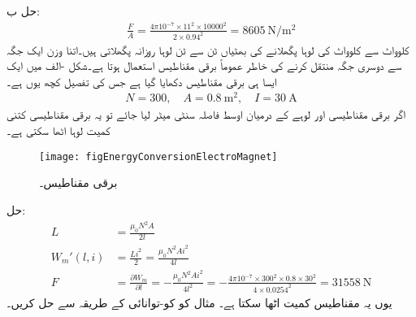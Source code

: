 حل ب:
\begin{align*}
\frac{F}{A}=\frac{4\pi 10^{-7} \times 11^2 \times 10000^2 }{2 \times 0.94^2}=\SI{8605}{\newton \per \meter \squared}
\end{align*}
%
  کلوواٹ سے   کلوواٹ کی لوہا پگھلانے کی بھٹیاں  ٹن سے  ٹن لوہا روزانہ پگھلاتی ہیں۔اتنا وزن ایک جگہ سے دوسری جگہ منتقل کرنے کی خاطر عموماً برقی مقناطیس استعمال ہوتا ہے۔شکل -الف میں ایک ایسا ہی برقی مقناطیس دکھایا گیا ہے جس کی تفصیل کچھ یوں ہے۔
\begin{align*}
N=300, \quad A=\SI{0.8}{\meter \squared}, \quad I=\SI{30}{\ampere}
\end{align*}
اگر برقی مقناطیسی اور لوہے کے درمیان اوسط فاصلہ  سنٹی میٹر لیا جائے تو یہ برقی مقناطیسی کتنی کمیت لوہا اٹھا سکتی ہے۔
\begin{figure}
\centering
\texttt{[image: figEnergyConversionElectroMagnet]}
\caption{برقی مقناطیس۔}
\label{شکل_تبادلہ_توانائی_برقی_مقناطیس}
\end{figure}

حل:
\begin{align*}
L&=\frac{\mu_0 N^2 A}{2 l}\\
W_m'(l,i)&=\frac{L i^2}{2}=\frac{\mu_0 N^2 A i^2}{4 l}\\
F&=\frac{\partial W_m}{\partial l}=-\frac{\mu_0 N^2 A i^2}{4 l^2}=-\frac{4\pi 10^{-7} \times 300^2 \times 0.8  \times 30^2}{4 \times 0.0254^2}=\SI{31558}{\newton}
\end{align*}
یوں یہ مقناطیس  کمیت اٹھا سکتا ہے۔
%
مثال  کو کو-توانائی کے طریقہ سے حل کریں۔

